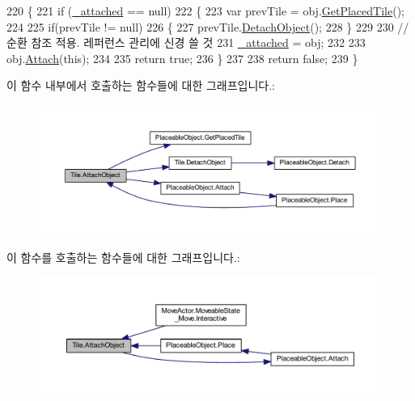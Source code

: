 \begin{DoxyCode}
220     \{
221         \textcolor{keywordflow}{if} (\hyperlink{class_tile_aa548ae60732f4d054b6777436baefdd5}{\_attached} == null)
222         \{
223             var prevTile = obj.\hyperlink{class_placeable_object_ab44a9b122632ac3cf0babb5040e8a201}{GetPlacedTile}();
224 
225             \textcolor{keywordflow}{if}(prevTile != null)
226             \{
227                 prevTile.\hyperlink{class_tile_ab8ab187ab674cfb222f761feac3b20b3}{DetachObject}();
228             \}
229 
230             \textcolor{comment}{// 순환 참조 적용. 레퍼런스 관리에 신경 쓸 것}
231             \hyperlink{class_tile_aa548ae60732f4d054b6777436baefdd5}{\_attached} = obj;
232 
233             obj.\hyperlink{class_placeable_object_a3176ec3d5d26b2a83cdc58b01e630aa1}{Attach}(\textcolor{keyword}{this});
234 
235             \textcolor{keywordflow}{return} \textcolor{keyword}{true};
236         \}
237 
238         \textcolor{keywordflow}{return} \textcolor{keyword}{false};
239     \}
\end{DoxyCode}


이 함수 내부에서 호출하는 함수들에 대한 그래프입니다.\+:\nopagebreak
\begin{figure}[H]
\begin{center}
\leavevmode
\includegraphics[width=350pt]{class_tile_a1969ee41c320c6e7748a33374942e07e_cgraph}
\end{center}
\end{figure}




이 함수를 호출하는 함수들에 대한 그래프입니다.\+:\nopagebreak
\begin{figure}[H]
\begin{center}
\leavevmode
\includegraphics[width=350pt]{class_tile_a1969ee41c320c6e7748a33374942e07e_icgraph}
\end{center}
\end{figure}


